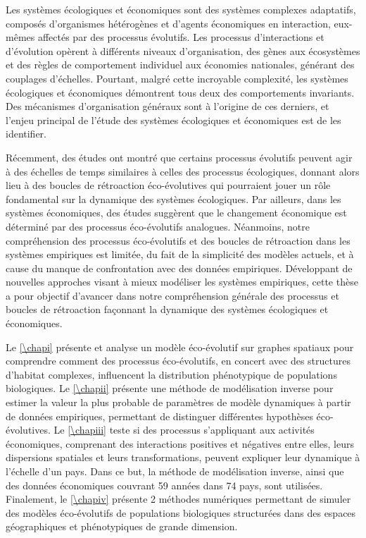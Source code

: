 \small{
\noindent Les systèmes écologiques et économiques sont des systèmes complexes adaptatifs, composés d'organismes hétérogènes et d'agents économiques en interaction, eux-mêmes affectés par des processus évolutifs. Les processus d'interactions et d'évolution opèrent à différents niveaux d'organisation, des gènes aux écosystèmes et des règles de comportement individuel aux économies nationales, générant des couplages d'échelles. Pourtant, malgré cette incroyable complexité, les systèmes écologiques et économiques démontrent tous deux des comportements invariants. Des mécanismes d'organisation généraux sont à l'origine de ces derniers, et l'enjeu principal de l'étude des systèmes écologiques et économiques est de les identifier.
 
Récemment, des études ont montré que certains processus évolutifs peuvent agir à des échelles de temps similaires à celles des processus écologiques, donnant alors lieu à des boucles de rétroaction éco-évolutives qui pourraient jouer un rôle fondamental sur la dynamique des systèmes écologiques. Par ailleurs, dans les systèmes économiques, des études suggèrent que le changement économique est déterminé par des processus éco-évolutifs analogues. Néanmoins, notre compréhension des processus éco-évolutifs et des boucles de rétroaction dans les systèmes empiriques est limitée, du fait de la simplicité des modèles actuels, et à cause du manque de confrontation avec des données empiriques.  Développant de nouvelles approches visant à mieux modéliser les systèmes empiriques, cette thèse a pour objectif d'avancer dans notre compréhension générale des processus et boucles de rétroaction façonnant la dynamique des systèmes écologiques et économiques.
 
Le \cref{\chapi} présente et analyse un modèle éco-évolutif sur graphes spatiaux pour comprendre comment des processus éco-évolutifs, en concert avec des structures d'habitat complexes, influencent la distribution phénotypique de populations biologiques. Le \cref{\chapii} présente une méthode de modélisation inverse pour estimer la valeur la plus probable de paramètres de modèle dynamiques à partir de données empiriques, permettant de distinguer différentes hypothèses éco-évolutives. Le \cref{\chapiii} teste si des processus s'appliquant aux activités économiques, comprenant des interactions positives et négatives entre elles, leurs dispersions spatiales et leurs transformations, peuvent expliquer leur dynamique à l'échelle d'un pays. Dans ce but, la méthode de modélisation inverse, ainsi que des données économiques couvrant 59 années dans 74 pays, sont utilisées. Finalement, le \cref{\chapiv} présente 2 méthodes numériques permettant de simuler des modèles éco-évolutifs de populations biologiques structurées dans des espaces géographiques et phénotypiques de grande dimension.
 
}
